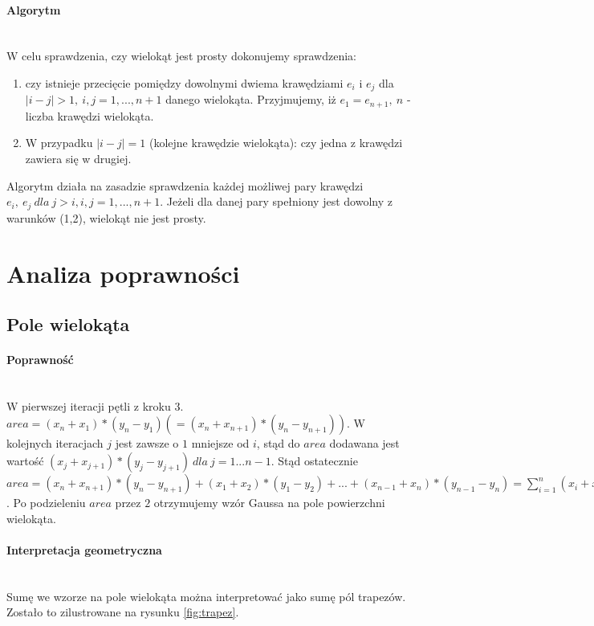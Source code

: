 \documentclass{article}
\begin{document}
\paragraph{Algorytm}\mbox{}\\
W celu sprawdzenia, czy wielokąt jest prosty dokonujemy sprawdzenia:
\begin{enumerate}
\item czy istnieje przecięcie pomiędzy dowolnymi dwiema krawędziami $e_i$ i $e_j$ dla $|i-j|>1,\ i,j=1,...,n+1$ danego wielokąta. Przyjmujemy, iż $e_1 = e_{n+1},\ n$ - liczba krawędzi wielokąta. 
\item W przypadku $|i-j|=1$ (kolejne krawędzie wielokąta): czy jedna z krawędzi zawiera się w drugiej.
\end{enumerate}
Algorytm działa na zasadzie sprawdzenia każdej możliwej pary krawędzi $e_i,\ e_j\ dla\ j>i, i,j=1,...,n+1$. Jeżeli dla danej pary spełniony jest dowolny z warunków (1,2), wielokąt nie jest prosty.
\section{Analiza poprawności}

\subsection{Pole wielokąta}
\paragraph{Poprawność} \mbox{}\\
W pierwszej iteracji pętli z kroku 3. \(area = (x_n+x_1)*(y_n-y_1) (=(x_n+x_{n+1})*(y_n-y_{n+1}))\). W kolejnych iteracjach \(j\) jest zawsze o \(1\) mniejsze od \(i\), stąd do \(area\) dodawana jest wartość \((x_j+x_{j+1})*(y_j-y_{j+1})\ dla\ j = 1...n-1\). Stąd ostatecznie \(area = (x_n+x_{n+1})*(y_n-y_{n+1}) + (x_1+x_2)*(y_1-y_2) + ... + (x_{n-1}+x_n)*(y_{n-1}-y_{n}) = \sum\limits_{i=1}^n (x_i+x_{i+1})*(y_{i+1}-y_i)\). Po podzieleniu \(area\) przez \(2\) otrzymujemy wzór Gaussa na pole powierzchni wielokąta.

\paragraph{Interpretacja geometryczna} \mbox{}\\
Sumę we wzorze na pole wielokąta można interpretować jako sumę pól trapezów. Zostało to zilustrowane na rysunku \ref{fig:trapez}.
\end{document}
